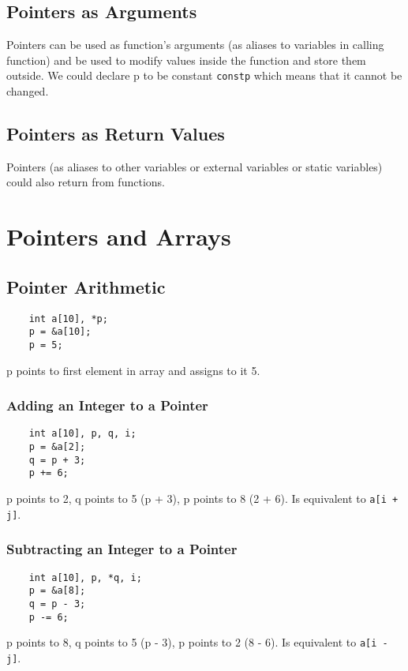 \documentclass[openany]{book}
\begin{document}
    \section{Pointers as Arguments}
    Pointers can be used as function's arguments (as aliases to variables in calling function)
    and be used to modify values inside the function and store them outside. We could declare
    p to be constant \texttt{constp} which means that it cannot be changed.

    \section{Pointers as Return Values}
    Pointers (as aliases to other variables or external variables or static variables) could also return from functions. 

    \chapter{Pointers and Arrays}

    \section{Pointer Arithmetic}
    \begin{lstlisting}
    int a[10], *p;
    p = &a[10];
    p = 5;
    \end{lstlisting}
    p points to first element in array and assigns to it 5.

    \subsection*{Adding an Integer to a Pointer}
    \begin{lstlisting}
    int a[10], p, q, i;
    p = &a[2];
    q = p + 3;
    p += 6;
    \end{lstlisting}
    p points to 2, q points to 5 (p + 3), p points to 8 (2 + 6). Is equivalent to \texttt{a[i + j]}.

    \subsection*{Subtracting an Integer to a Pointer}
    \begin{lstlisting}
    int a[10], p, *q, i;
    p = &a[8];
    q = p - 3;
    p -= 6;
    \end{lstlisting}
    p points to 8, q points to 5 (p - 3), p points to 2 (8 - 6). Is equivalent to \texttt{a[i - j]}.
\end{document}
